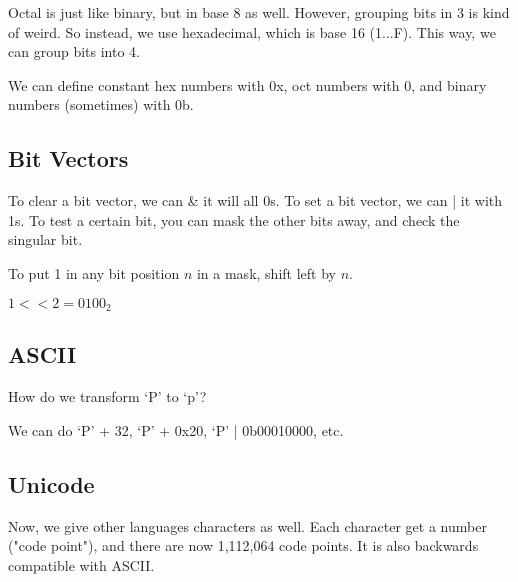 
Octal is just like binary, but in base 8 as well. However, grouping bits in 3 is kind of weird. So instead, we use hexadecimal, which is base 16 (1...F). This way, we can group bits into 4.

We can define constant hex numbers with 0x, oct numbers with 0, and binary numbers (sometimes) with 0b.

\subsection{Bit Vectors}

To clear a bit vector, we can \& it will all 0s. To set a bit vector, we can | it with 1s. To test a certain bit, you can mask the other bits away, and check the singular bit.

To put 1 in any bit position \( n \) in a mask, shift left by \( n \).

\begin{eg}
	\( 1 << 2 = 0100_2 \)
\end{eg}

\subsection{ASCII}

\begin{eg}
	How do we transform `P' to `p'?
\end{eg}
\begin{explanation}
	We can do `P' + 32, `P' + 0x20, `P' | 0b00010000, etc.
\end{explanation}

\subsection{Unicode}

Now, we give other languages characters as well. Each character get a number ("code point"), and there are now 1,112,064 code points. It is also backwards compatible with ASCII.
